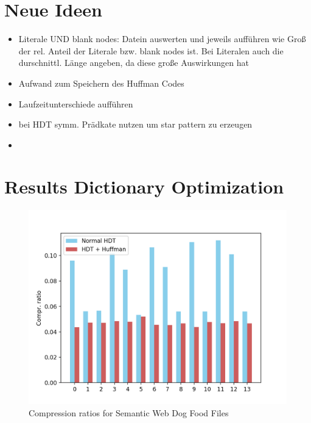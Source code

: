 \documentclass[a4paper]{scrartcl}
\begin{document}
\section{Neue Ideen}
\begin{itemize}
	\item Literale UND blank nodes: Datein auswerten und jeweils aufführen wie Groß der rel. Anteil der Literale bzw. blank nodes ist. Bei Literalen auch die durschnittl. Länge angeben, da diese große Auswirkungen hat
	\item Aufwand zum Speichern des Huffman Codes
	\item Laufzeitunterschiede aufführen
	
	\item bei HDT symm. Prädkate nutzen um star pattern zu erzeugen
	\item 
\end{itemize}

\section{Results Dictionary Optimization}


\begin{figure}
	\centering
	\includegraphics[width=1\linewidth]{../Benchmark/img/evalLit/ratios_dog}
	\caption{Compression ratios for Semantic Web Dog Food Files}
	\label{fig:ratiosdog}
\end{figure}
\end{document}
